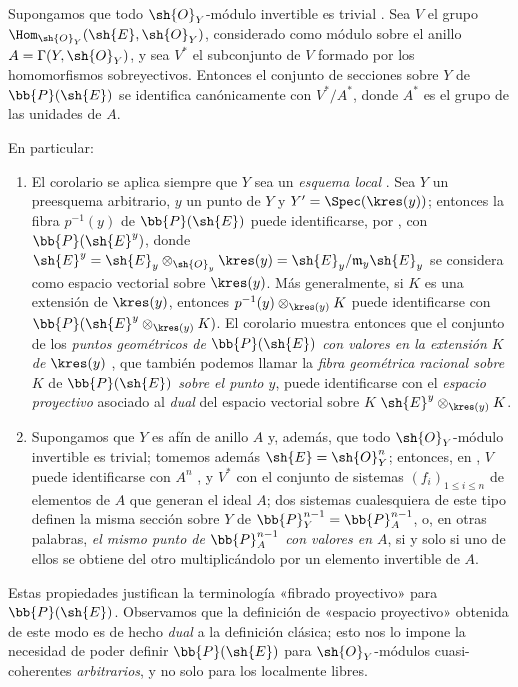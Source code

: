 \documentclass[oneside,10pt]{amsart}
\renewcommand{\leq}{\leqslant}
\newcommand{\oldpage}[2][]{\marginnote{\normalfont\footnotesize\textbf{#1}~|~#2}\ignorespaces}
\let\EGAOriginalLabel\label
\renewcommand{\label}[1]{\phantomsection\EGAOriginalLabel{#1}}
\begin{document}
\begin{corollary}[4.2.6]
\label{II.4.2.6}
Supongamos que todo $\sh{O}_Y$-módulo invertible es trivial .
Sea $V$ el grupo $\Hom_{\sh{O}_Y}(\sh{E},\sh{O}_Y)$, considerado como módulo sobre el anillo $A=\Gamma(Y,\sh{O}_Y)$, y sea $V^*$ el subconjunto de $V$ formado por los homomorfismos sobreyectivos.
Entonces el conjunto de secciones sobre $Y$ de $\bb{P}(\sh{E})$ se identifica canónicamente con $V^*/A^*$, donde $A^*$ es el grupo de las unidades de $A$.
\end{corollary}

\oldpage[II]{75}
En particular:
\begin{enumerate}
  \item El corolario  se aplica siempre que $Y$ sea un \emph{esquema local} .
    Sea $Y$ un preesquema arbitrario, $y$ un punto de $Y$ y $Y'=\Spec(\kres(y))$;
    entonces la fibra $p^{-1}(y)$ de $\bb{P}(\sh{E})$ puede identificarse, por , con $\bb{P}(\sh{E}^y)$, donde $\sh{E}^y=\sh{E}_y\otimes_{\sh{O}_y}\kres(y)=\sh{E}_y/\mathfrak{m}_y\sh{E}_y$ se considera como espacio vectorial sobre $\kres(y)$.
    Más generalmente, si $K$ es una extensión de $\kres(y)$, entonces $p^{-1}(y)\otimes_{\kres(y)}K$ puede identificarse con $\bb{P}(\sh{E}^y\otimes_{\kres(y)}K)$.
    El corolario  muestra entonces que el conjunto de los \emph{puntos geométricos de $\bb{P}(\sh{E})$ con valores en la extensión $K$ de $\kres(y)$} , que también podemos llamar la \emph{fibra geométrica racional sobre} $K$ de $\bb{P}(\sh{E})$ \emph{sobre el punto $y$}, puede identificarse con el \emph{espacio proyectivo} asociado al \emph{dual} del espacio vectorial sobre $K$ $\sh{E}^y\otimes_{\kres(y)}K$.
  \item Supongamos que $Y$ es afín de anillo $A$ y, además, que todo $\sh{O}_Y$-módulo invertible es trivial;
    tomemos además $\sh{E}=\sh{O}_Y^n$;
    entonces, en , $V$ puede identificarse con $A^n$ , y $V^*$ con el conjunto de sistemas $(f_i)_{1\leq i\leq n}$ de elementos de $A$ que generan el ideal $A$;
    dos sistemas cualesquiera de este tipo definen la misma sección sobre $Y$ de $\bb{P}_Y^{n-1}=\bb{P}_A^{n-1}$, o, en otras palabras, \emph{el mismo punto de $\bb{P}_A^{n-1}$ con valores en $A$}, si y solo si uno de ellos se obtiene del otro multiplicándolo por un elemento invertible de $A$.
\end{enumerate}

Estas propiedades justifican la terminología «fibrado proyectivo» para $\bb{P}(\sh{E})$.
Observamos que la definición de «espacio proyectivo» obtenida de este modo es de hecho \emph{dual} a la definición clásica;
esto nos lo impone la necesidad de poder definir $\bb{P}(\sh{E})$ para $\sh{O}_Y$-módulos cuasi-coherentes \emph{arbitrarios}, y no solo para los localmente libres.
\end{document}
